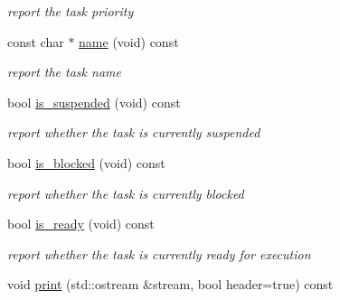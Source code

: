 \begin{DoxyCompactItemize}
\begin{DoxyCompactList}\small\item\em report the task priority \end{DoxyCompactList}\item 
const char $\ast$ \hyperlink{class_r_t_o_s_1_1task_a56e4d07750c49b6620b0407013b177c1}{name} (void) const \hypertarget{class_r_t_o_s_1_1task_a56e4d07750c49b6620b0407013b177c1}{}\label{class_r_t_o_s_1_1task_a56e4d07750c49b6620b0407013b177c1}

\begin{DoxyCompactList}\small\item\em report the task name \end{DoxyCompactList}\item 
bool \hyperlink{class_r_t_o_s_1_1task_ab02fe6432956956957bb2629dc9a3031}{is\+\_\+suspended} (void) const \hypertarget{class_r_t_o_s_1_1task_ab02fe6432956956957bb2629dc9a3031}{}\label{class_r_t_o_s_1_1task_ab02fe6432956956957bb2629dc9a3031}

\begin{DoxyCompactList}\small\item\em report whether the task is currently suspended \end{DoxyCompactList}\item 
bool \hyperlink{class_r_t_o_s_1_1task_a1e0b2566b673b0e4e6efd63a80284d35}{is\+\_\+blocked} (void) const \hypertarget{class_r_t_o_s_1_1task_a1e0b2566b673b0e4e6efd63a80284d35}{}\label{class_r_t_o_s_1_1task_a1e0b2566b673b0e4e6efd63a80284d35}

\begin{DoxyCompactList}\small\item\em report whether the task is currently blocked \end{DoxyCompactList}\item 
bool \hyperlink{class_r_t_o_s_1_1task_a8ec666474a7668f78da3438dfa818a8e}{is\+\_\+ready} (void) const \hypertarget{class_r_t_o_s_1_1task_a8ec666474a7668f78da3438dfa818a8e}{}\label{class_r_t_o_s_1_1task_a8ec666474a7668f78da3438dfa818a8e}

\begin{DoxyCompactList}\small\item\em report whether the task is currently ready for execution \end{DoxyCompactList}\item 
void \hyperlink{class_r_t_o_s_1_1task_ac94209dd2efea030a70d48dabc890f38}{print} (std\+::ostream \&stream, bool header=true) const \hypertarget{class_r_t_o_s_1_1task_ac94209dd2efea030a70d48dabc890f38}{}\label{class_r_t_o_s_1_1task_ac94209dd2efea030a70d48dabc890f38}


\end{DoxyCompactItemize}
